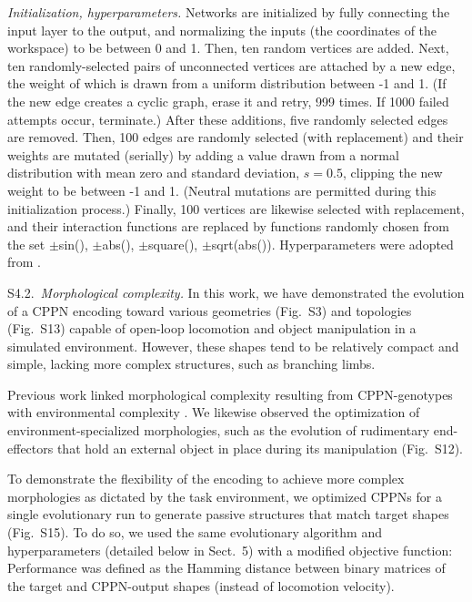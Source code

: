 \textit{Initialization, hyperparameters.}  
Networks are initialized by fully connecting the input layer to the output, and normalizing the inputs (the coordinates of the workspace) to be between 0 and 1. Then, ten random vertices are added. 
Next, ten randomly-selected pairs of unconnected vertices are attached by a new edge, the weight of which is drawn from a uniform distribution between -1 and 1. 
(If the new edge creates a cyclic graph, erase it and retry, 999 times. If 1000 failed attempts occur, terminate.) 
After these additions, five randomly selected edges are removed. 
Then, 100 edges are randomly selected (with replacement) and their weights are mutated (serially) by adding a value drawn from a normal distribution with mean zero and standard deviation, $s=0.5$, clipping the new weight to be between -1 and 1. 
(Neutral mutations are permitted during this initialization process.) 
Finally, 100 vertices are likewise selected with replacement, and their interaction functions are replaced by functions randomly chosen from the set {{$\pm$}sin(), {$\pm$}abs(), {$\pm$}square(), {$\pm$}sqrt(abs())}. Hyperparameters were adopted from \cite{kriegman2019automated}.

\vspace{1em}

S4.2.~\textit{Morphological complexity.}  
In this work, we have demonstrated the evolution of a CPPN encoding toward various geometries (Fig.~S3) and topologies (Fig.~S13) capable of open-loop locomotion and object manipulation in a simulated environment. 
However, these shapes tend to be relatively compact and simple, lacking more complex structures, such as branching limbs.

Previous work linked morphological complexity resulting from CPPN-genotypes with environmental complexity \cite{auerbach2014environmental}. 
We likewise observed the optimization of environment-specialized morphologies, such as the evolution of rudimentary end-effectors that hold an external object in place during its manipulation (Fig.~S12).

To demonstrate the flexibility of the encoding to achieve more complex morphologies as dictated by the task environment, we optimized CPPNs for a single evolutionary run to generate passive structures that match target shapes (Fig.~S15). 
To do so, we used the same evolutionary algorithm and hyperparameters (detailed below in Sect.~5) with a modified objective function: Performance was defined as the Hamming distance between binary matrices of the target and CPPN-output shapes (instead of locomotion velocity). 

